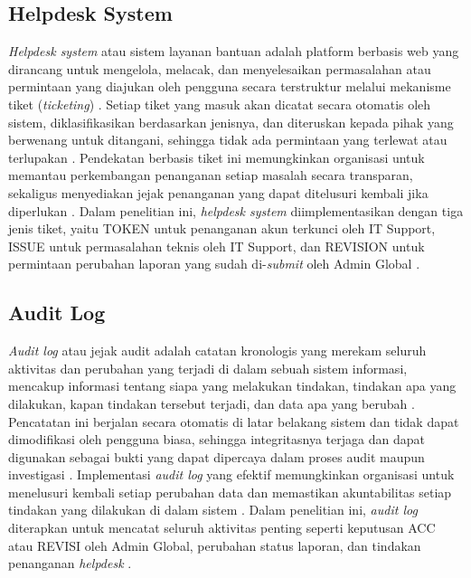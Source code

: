 \subsection{Helpdesk System} \label{II.Helpdesk}
\textit{Helpdesk system} atau sistem layanan bantuan adalah platform berbasis web yang dirancang untuk mengelola, melacak, dan menyelesaikan permasalahan atau permintaan yang diajukan oleh pengguna secara terstruktur melalui mekanisme tiket (\textit{ticketing}) \cite{sharma2023helpdesk}. Setiap tiket yang masuk akan dicatat secara otomatis oleh sistem, diklasifikasikan berdasarkan jenisnya, dan diteruskan kepada pihak yang berwenang untuk ditangani, sehingga tidak ada permintaan yang terlewat atau terlupakan \cite{sharma2023helpdesk}. Pendekatan berbasis tiket ini memungkinkan organisasi untuk memantau perkembangan penanganan setiap masalah secara transparan, sekaligus menyediakan jejak penanganan yang dapat ditelusuri kembali jika diperlukan \cite{sharma2023helpdesk}. Dalam penelitian ini, \textit{helpdesk system} diimplementasikan dengan tiga jenis tiket, yaitu TOKEN untuk penanganan akun terkunci oleh IT Support, ISSUE untuk permasalahan teknis oleh IT Support, dan REVISION untuk permintaan perubahan laporan yang sudah di-\textit{submit} oleh Admin Global \cite{dani2026pelaporan}. \par

\subsection{Audit Log} \label{II.AuditLog}
\textit{Audit log} atau jejak audit adalah catatan kronologis yang merekam seluruh aktivitas dan perubahan yang terjadi di dalam sebuah sistem informasi, mencakup informasi tentang siapa yang melakukan tindakan, tindakan apa yang dilakukan, kapan tindakan tersebut terjadi, dan data apa yang berubah \cite{kayum2022auditlog}. Pencatatan ini berjalan secara otomatis di latar belakang sistem dan tidak dapat dimodifikasi oleh pengguna biasa, sehingga integritasnya terjaga dan dapat digunakan sebagai bukti yang dapat dipercaya dalam proses audit maupun investigasi \cite{kayum2022auditlog}. Implementasi \textit{audit log} yang efektif memungkinkan organisasi untuk menelusuri kembali setiap perubahan data dan memastikan akuntabilitas setiap tindakan yang dilakukan di dalam sistem \cite{kayum2022auditlog}. Dalam penelitian ini, \textit{audit log} diterapkan untuk mencatat seluruh aktivitas penting seperti keputusan ACC atau REVISI oleh Admin Global, perubahan status laporan, dan tindakan penanganan \textit{helpdesk} \cite{nugroho2025monitoring}. \par

